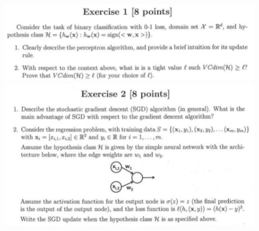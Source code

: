 \documentclass[a4paper,11pt,oneside]{book}
\begin{document}
\begin{figure}[H]
    \centering
    \begin{minipage}{0.45\textwidth}
        \includegraphics[width=\textwidth,page=3]{images/ex1_16_Feb_2022.png}
    \end{minipage}
    \hfill
    \begin{minipage}{0.45\textwidth}
        \includegraphics[width=\textwidth,page=5]{images/ex2_16_Feb_2022.png}
    \end{minipage}
    
    \vspace{1cm}
    

\end{figure}
\end{document}
